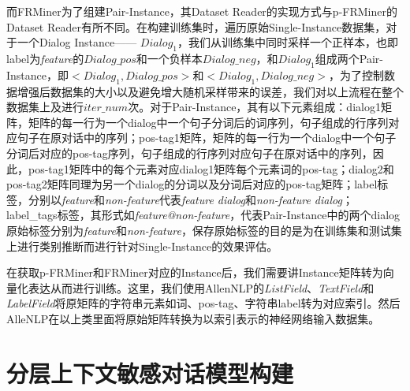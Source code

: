 而FRMiner为了组建Pair-Instance，其Dataset Reader的实现方式与p-FRMiner的Dataset Reader有所不同。在构建训练集时，遍历原始Single-Instance数据集，对于一个Dialog Instance—— $Dialog_1$，我们从训练集中同时采样一个正样本，也即label为\textit{feature}的$Dialog\_pos$和一个负样本$Dialog\_neg$，和$Dialog_1$组成两个Pair-Instance，即$<Dialog_1,Dialog\_pos>$和$<Dialog_1,Dialog\_neg>$，为了控制数据增强后数据集的大小以及避免增大随机采样带来的误差，我们对以上流程在整个数据集上及进行$iter\_num$次。对于Pair-Instance，其有以下元素组成：dialog1矩阵，矩阵的每一行为一个dialog中一个句子分词后的词序列，句子组成的行序列对应句子在原对话中的序列；pos-tag1矩阵，矩阵的每一行为一个dialog中一个句子分词后对应的pos-tag序列，句子组成的行序列对应句子在原对话中的序列，因此，pos-tag1矩阵中的每个元素对应dialog1矩阵每个元素词的pos-tag；dialog2和pos-tag2矩阵同理为另一个dialog的分词以及分词后对应的pos-tag矩阵；label标签，分别以\textit{feature}和\textit{non-feature}代表\textit{feature dialog}和\textit{non-feature dialog}；label\_tags标签，其形式如\textit{feature@non-feature}，代表Pair-Instance中的两个dialog原始标签分别为\textit{feature}和\textit{non-feature}，保存原始标签的目的是为在训练集和测试集上进行类别推断而进行针对Single-Instance的效果评估。

在获取p-FRMiner和FRMiner对应的Instance后，我们需要讲Instance矩阵转为向量化表达从而进行训练。这里，我们使用AllenNLP的\textit{ListField}、\textit{TextField}和\textit{LabelField}将原矩阵的字符串元素如词、pos-tag、字符串label转为对应索引。然后AlleNLP在以上类里面将原始矩阵转换为以索引表示的神经网络输入数据集。

\section{分层上下文敏感对话模型构建}



